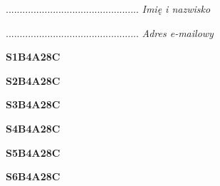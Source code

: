 \begin{turn}{90}\begin{minipage}{\linewidth} \vspace{20mm} ................................................  \textit{Imię i nazwisko}\end{minipage}\end{turn}

\begin{turn}{90}\begin{minipage}{\linewidth} \vspace{20mm} ................................................  \textit{Adres e-mailowy}\end{minipage}\end{turn}

\begin{turn}{90}\huge \begin{minipage}{\linewidth} \vspace{10mm}\textbf{S1B4A28C}\end{minipage}\end{turn}

\begin{turn}{90}\huge \begin{minipage}{\linewidth} \vspace{10mm}\textbf{S2B4A28C}\end{minipage}\end{turn}

\begin{turn}{90}\huge \begin{minipage}{\linewidth} \vspace{10mm}\textbf{S3B4A28C}\end{minipage}\end{turn}

\begin{turn}{90}\huge \begin{minipage}{\linewidth} \vspace{10mm}\textbf{S4B4A28C}\end{minipage}\end{turn}

\begin{turn}{90}\huge \begin{minipage}{\linewidth} \vspace{10mm}\textbf{S5B4A28C}\end{minipage}\end{turn}

\begin{turn}{90}\huge \begin{minipage}{\linewidth} \vspace{10mm}\textbf{S6B4A28C}\end{minipage}\end{turn}

